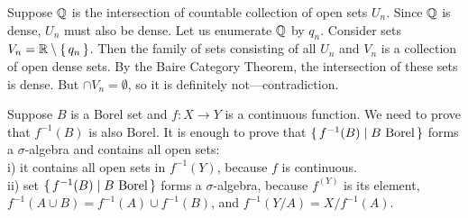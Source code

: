 \documentclass[12pt]{article}
\theoremstyle{definition}
\newenvironment{customthm}[1]
  {\renewcommand\theinnercustomthm{#1}\innercustomthm}
  {\endinnercustomthm}
\begin{document}
\begin{customthm}{I.4.13}
    Suppose ${\mathbb Q}$ is the intersection of countable collection of open sets $U_n$. Since ${\mathbb Q}$ is dense, $U_n$ must also be dense. Let us enumerate ${\mathbb Q}$ by $q_n$. Consider sets $V_n = {\mathbb R} \setminus \{\,{q_n}\,\}$. Then the family of sets consisting of all $U_n$ and $V_n$ is a collection of open dense sets. By the Baire Category Theorem, the intersection of these sets is dense. But $\cap V_n = \emptyset$, so it is definitely not---contradiction.
\end{customthm}

\begin{customthm}{I.4.13}
    Suppose $B$ is a Borel set and $f \colon X \to Y$ is a continuous function. We need to prove that $f^{-1}(B)$ is also Borel. It is enough to prove that $\{\,{f^{-1}(B) \mid B \text{ Borel}}\,\}$ forms a $\sigma$-algebra and contains all open sets:
    \\
    i) it contains all open sets in $f^{-1}(Y)$, because $f$ is continuous.
    \\
    ii) set $\{\,{f^{-1}(B) \mid B \text{ Borel}}\,\}$ forms a $\sigma$-algebra, because $f^(Y)$ is its element, $f^{-1}(A \cup B) = f^{-1}(A) \cup f^{-1}(B)$, and $f^{-1}(Y/A) = X/f^{-1}(A)$.
\end{customthm}
\end{document}
